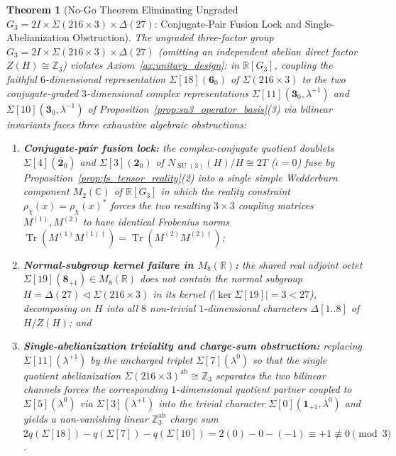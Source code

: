 \documentclass[11pt,a4paper]{article}
\newtheorem{theorem}{Theorem}[section]
\theoremstyle{definition}
\theoremstyle{remark}
\newcommand{\R}{\mathbb{R}}
\newcommand{\C}{\mathbb{C}}
\newcommand{\Z}{\mathbb{Z}}
\newcommand{\Tr}{\operatorname{Tr}}
\newcommand{\SU}{\operatorname{SU}}
\newcommand{\Gthree}{G_3}
\begin{document}
\begin{theorem}[No-Go Theorem Eliminating Ungraded $\Gthree = 2I \times \Sigma(216 \times 3) \times \Delta(27)$: Conjugate-Pair Fusion Lock and Single-Abelianization Obstruction]
\label{thm:nogo3}
The ungraded three-factor group $\Gthree = 2I \times \Sigma(216 \times 3) \times \Delta(27)$ (omitting an independent abelian direct factor $Z(H) \cong \Z_3$) violates Axiom~\ref{ax:unitary_design}: in $\R[\Gthree]$, coupling the faithful $6$-dimensional representation $\Sigma[18](\mathbf{6}_0)$ of $\Sigma(216 \times 3)$ to the two conjugate-graded $3$-dimensional complex representations $\Sigma[11](\mathbf{3}_0, \lambda^{+1})$ and $\Sigma[10](\mathbf{3}_0, \lambda^{-1})$ of Proposition~\ref{prop:su3_operator_basis}(3) via bilinear invariants faces three exhaustive algebraic obstructions:
\begin{enumerate}
    \item \textbf{Conjugate-pair fusion lock:} the complex-conjugate quotient doublets $\Sigma[4](\bar{\mathbf{2}}_0)$ and $\Sigma[3](\mathbf{2}_0)$ of $N_{\SU(3)}(H)/H \cong 2T$ ($\iota = 0$) fuse by Proposition~\ref{prop:fs_tensor_reality}(2) into a single simple Wedderburn component $M_2(\C)$ of $\R[\Gthree]$ in which the reality constraint $\rho_{\bar{\chi}}(x) = \rho_\chi(x)^*$ forces the two resulting $3 \times 3$ coupling matrices $M^{(1)}, M^{(2)}$ to have identical Frobenius norms $\Tr(M^{(1)} M^{(1)\dagger}) = \Tr(M^{(2)} M^{(2)\dagger})$;
    \item \textbf{Normal-subgroup kernel failure in $M_8(\R)$:} the shared real adjoint octet $\Sigma[19](\mathbf{8}_{+1}) \in M_8(\R)$ does not contain the normal subgroup $H = \Delta(27) \triangleleft \Sigma(216 \times 3)$ in its kernel ($|\ker\Sigma[19]| = 3 < 27$), decomposing on $H$ into all $8$ non-trivial $1$-dimensional characters $\Delta[1..8]$ of $H/Z(H)$; and
    \item \textbf{Single-abelianization triviality and charge-sum obstruction:} replacing $\Sigma[11](\lambda^{+1})$ by the uncharged triplet $\Sigma[7](\lambda^0)$ so that the single quotient abelianization $\Sigma(216 \times 3)^{\mathrm{ab}} \cong \Z_3$ separates the two bilinear channels forces the corresponding $1$-dimensional quotient partner coupled to $\Sigma[5](\lambda^0)$ via $\Sigma[3](\lambda^{+1})$ into the trivial character $\Sigma[0](\mathbf{1}_{+1}, \lambda^0)$ and yields a non-vanishing linear $\Z_3^{\mathrm{ab}}$ charge sum $2q(\Sigma[18]) - q(\Sigma[7]) - q(\Sigma[10]) = 2(0) - 0 - (-1) \equiv +1 \not\equiv 0 \pmod 3$.
\end{enumerate}
\end{theorem}
\end{document}
